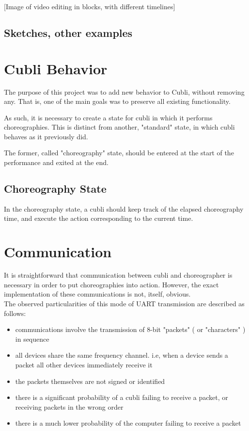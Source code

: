 [Image of video editing in blocks, with different timelines]\\


\subsection{Sketches, other examples}

\section{Cubli Behavior}

The purpose of this project was to add new behavior to Cubli, without removing any. That is, one of the main goals was to preserve all existing functionality.

As such, it is necessary to create a state for cubli in which it performs choreographies. This is distinct from another, "standard" state, in which cubli behaves as it previously did.

The former, called "choreography" state, should be entered at the start of the performance and exited at the end.

\subsection{Choreography State}

In the choreography state, a cubli should keep track of the elapsed choreography time, and execute the action corresponding to the current time.

\section{Communication}

It is straightforward that communication between cubli and choreographer is necessary in order to put choreographies into action. However, the exact implementation of these communications is not, itself, obvious.\\

The observed particularities of this mode of UART transmission are described as follows:
\begin{itemize}
\item communications involve the transmission of 8-bit "packets" ( or "characters" ) in sequence
\item all devices share the same frequency channel. i.e, when a device sends a packet all other devices immediately receive it
\item the packets themselves are not signed or identified
\item there is a significant probability of a cubli failing to receive a packet, or receiving packets in the wrong order
\item there is a much lower probability of the computer failing to receive a packet
\end{itemize}

